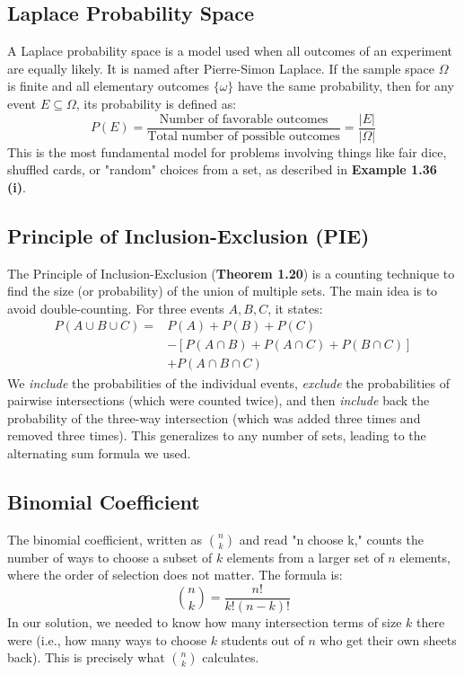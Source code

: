 \documentclass[11pt,a4paper]{article}
\begin{document}
\subsection{Laplace Probability Space \label{note:laplace}}
A Laplace probability space is a model used when all outcomes of an experiment are equally likely. It is named after Pierre-Simon Laplace. If the sample space $\Omega$ is finite and all elementary outcomes $\{\omega\}$ have the same probability, then for any event $E \subseteq \Omega$, its probability is defined as:
\[ P(E) = \frac{\text{Number of favorable outcomes}}{\text{Total number of possible outcomes}} = \frac{|E|}{|\Omega|} \]
This is the most fundamental model for problems involving things like fair dice, shuffled cards, or "random" choices from a set, as described in \textbf{Example 1.36 (i)}.

\subsection{Principle of Inclusion-Exclusion (PIE) \label{note:pie}}
The Principle of Inclusion-Exclusion (\textbf{Theorem 1.20}) is a counting technique to find the size (or probability) of the union of multiple sets. The main idea is to avoid double-counting. For three events $A, B, C$, it states:
\begin{align*}
P(A \cup B \cup C) = & P(A) + P(B) + P(C) \\
& - [P(A \cap B) + P(A \cap C) + P(B \cap C)] \\
& + P(A \cap B \cap C)
\end{align*}
We \textit{include} the probabilities of the individual events, \textit{exclude} the probabilities of pairwise intersections (which were counted twice), and then \textit{include} back the probability of the three-way intersection (which was added three times and removed three times). This generalizes to any number of sets, leading to the alternating sum formula we used.

\subsection{Binomial Coefficient \label{note:binomial}}
The binomial coefficient, written as $\binom{n}{k}$ and read "n choose k," counts the number of ways to choose a subset of $k$ elements from a larger set of $n$ elements, where the order of selection does not matter. The formula is:
\[ \binom{n}{k} = \frac{n!}{k!(n-k)!} \]
In our solution, we needed to know how many intersection terms of size $k$ there were (i.e., how many ways to choose $k$ students out of $n$ who get their own sheets back). This is precisely what $\binom{n}{k}$ calculates.
\end{document}

